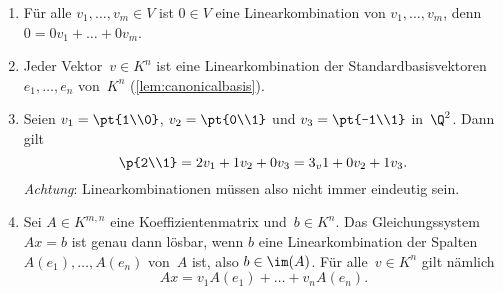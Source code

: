 \documentclass[a4paper]{article}
\begin{document}
\begin{example}\leavevmode
    \begin{enumerate}
        \item Für alle $v_1,\dots,v_m \in V$ ist $0 \in V$ eine Linearkombination von $v_1,\dots,v_m$, denn $0 = 0v_1+\dots+0v_m$.
        \item Jeder Vektor~$v \in K^n$ ist eine Linearkombination der Standardbasisvektoren $e_1,\dots,e_n$ von~$K^n$ (\cref{lem:canonicalbasis}).
        \item Seien $v_1 = \pt{1\\0}$, $v_2 = \pt{0\\1}$ und $v_3 = \pt{-1\\1}$ in~$\Q^2$. Dann gilt
        \begin{equation*}
            \p{2\\1} = 2v_1 + 1v_2 + 0v_3 = 3_v1 + 0v_2 + 1v_3.
        \end{equation*}
        \emph{Achtung}: Linearkombinationen müssen also nicht immer eindeutig sein.
        \item Sei $A \in K^{m,n}$ eine Koeffizientenmatrix und~$b \in K^n$. Das Gleichungssystem $Ax = b$ ist genau dann lösbar, wenn $b$ eine Linearkombination der Spalten $A(e_1),\dots,A(e_n)$ von~$A$ ist, also $b \in \im(A)$. Für alle~$v \in K^n$ gilt nämlich
        \begin{equation*}
            Ax = v_1A(e_1) + \dots + v_nA(e_n).
        \end{equation*}
    \end{enumerate}
\end{example}

\end{document}
